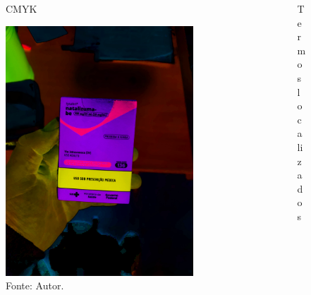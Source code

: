\begin{frame}
	\begin{columns}
		\begin{column}{0.5\textwidth}
			\begin{figure}
				\caption*{CMYK}
				\includegraphics[width=0.85\textwidth]{../pictures/tysabri_cmyk.jpg}
				\caption*{Fonte: Autor.}
			\end{figure}
		\end{column}
		\begin{column}{0.5\textwidth}
			\begin{figure}
				\caption*{Termos localizados}

\end{figure}
\end{column}
\end{columns}
\end{frame}
